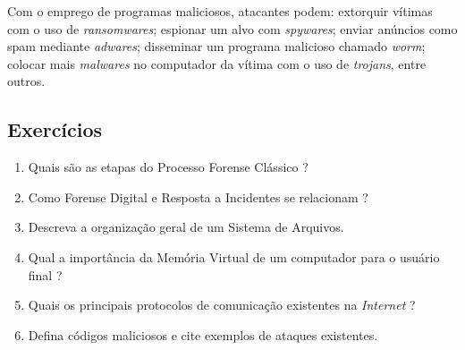     \hspace{1cm}
    Com o emprego de programas maliciosos, atacantes podem: extorquir vítimas com o uso de \textit{ransomwares}; espionar um alvo com \textit{spywares}; enviar anúncios como spam mediante \textit{adwares}; disseminar um programa malicioso chamado \textit{worm}; colocar mais \textit{malwares} no computador da vítima com o uso de \textit{trojans}, entre outros.

    \subsection{Exercícios}
    
    \begin{example} \label{cap1_exercicios}
        \begin{enumerate}
            \item Quais são as etapas do Processo Forense Clássico ?
            \item Como Forense Digital e Resposta a Incidentes se relacionam ?
            \item Descreva a organização geral de um Sistema de Arquivos.
            \item Qual a importância da Memória Virtual de um computador para o usuário final ?
            \item Quais os principais protocolos de comunicação existentes na \textit{Internet} ?
            \item Defina códigos maliciosos e cite exemplos de ataques existentes.
        \end{enumerate}
    \end{example}
    
\newpage
